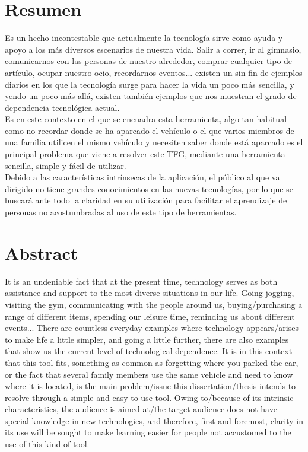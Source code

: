 \chapter{Resumen}

Es un hecho incontestable que actualmente la tecnología sirve como ayuda y apoyo a los más diversos escenarios de nuestra vida. Salir a correr, ir al gimnasio, comunicarnos con las personas de nuestro alrededor, comprar cualquier tipo de artículo, ocupar nuestro ocio, recordarnos eventos... existen un sin fin de ejemplos diarios en los que la tecnología surge para hacer la vida un poco más sencilla, y yendo un poco más allá, existen también ejemplos que nos muestran el grado de dependencia tecnológica actual.\\
Es en este contexto en el que se encuadra esta herramienta, algo tan habitual como no recordar donde se ha aparcado el vehículo o el que varios miembros de una familia utilicen el mismo vehículo y necesiten saber donde está aparcado es el principal problema que viene a resolver este \ac{TFG}, mediante una herramienta sencilla, simple y fácil de utilizar.\\
Debido a las características intrínsecas de la aplicación, el público al que va dirigido no tiene grandes conocimientos en las nuevas tecnologías, por lo que se buscará ante todo la claridad en su utilización para facilitar el aprendizaje de personas no acostumbradas al uso de este tipo de herramientas.\\


\chapter{Abstract}

It is an undeniable fact that at the present time, technology serves as both assistance and support to the most diverse situations in our life. Going jogging, visiting the gym, communicating with the people around us, buying/purchasing a range of different items, spending our leisure time, reminding us about different events... There are countless everyday examples where technology appears/arises to make life a little simpler, and going a little further, there are also examples that show us the current level of technological dependence.
It is in this context that this tool fits, something as common as forgetting where you parked the car, or the fact that several family members use the same vehicle and need to know where it is located, is the main problem/issue this dissertation/thesis intends to resolve through a simple and easy-to-use tool. Owing to/because of its intrinsic characteristics, the audience is aimed at/the target audience does not have special knowledge in new technologies, and therefore, first and foremost, clarity in its use will be sought to make learning easier for people not accustomed to the use of this kind of tool.
